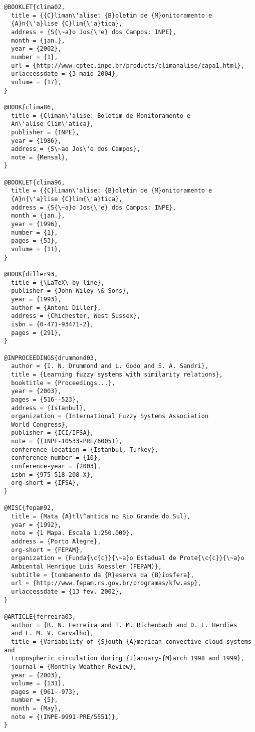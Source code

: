 \begin{verbatim}
@BOOKLET{clima02,
  title = {{C}liman\'alise: {B}oletim de {M}onitoramento e 
  {A}n{\'a}lise {C}lim{\'a}tica},
  address = {S{\~a}o Jos{\'e} dos Campos: INPE},
  month = {jan.},
  year = {2002},
  number = {1},
  url = {http://www.cptec.inpe.br/products/climanalise/capa1.html},
  urlaccessdate = {3 maio 2004},
  volume = {17},
}

@BOOK{clima86,
  title = {Climan\'alise: Boletim de Monitoramento e 
  An\'alise Clim\'atica},
  publisher = {INPE},
  year = {1986},
  address = {S\~ao Jos\'e dos Campos},
  note = {Mensal},
}

@BOOKLET{clima96,
  title = {{C}liman\'alise: {B}oletim de {M}onitoramento e 
  {A}n{\'a}lise {C}lim{\'a}tica},
  address = {S{\~a}o Jos{\'e} dos Campos: INPE},
  month = {jan.},
  year = {1996},
  number = {1},
  pages = {53},
  volume = {11},
}

@BOOK{diller93,
  title = {\LaTeX\ by line},
  publisher = {John Wiley \& Sons},
  year = {1993},
  author = {Antoni Diller},
  address = {Chichester, West Sussex},
  isbn = {0-471-93471-2},
  pages = {291},
}

@INPROCEEDINGS{drummond03,
  author = {I. N. Drummond and L. Godo and S. A. Sandri},
  title = {Learning fuzzy systems with similarity relations},
  booktitle = {Proceedings...},
  year = {2003},
  pages = {516--523},
  address = {Istanbul},
  organization = {International Fuzzy Systems Association 
  World Congress},
  publisher = {ICI/IFSA},
  note = {(INPE-10533-PRE/6005)},
  conference-location = {Istanbul, Turkey},
  conference-number = {10},
  conference-year = {2003},
  isbn = {975-518-208-X},
  org-short = {IFSA},
}

@MISC{fepam92,
  title = {Mata {A}tl\^antica no Rio Grande do Sul},
  year = {1992},
  note = {1 Mapa. Escala 1:250.000},
  address = {Porto Alegre},
  org-short = {FEPAM},
  organization = {Funda{\c{c}}{\~a}o Estadual de Prote{\c{c}}{\~a}o 
  Ambiental Henrique Luis Roessler (FEPAM)},
  subtitle = {tombamento da {R}eserva da {B}iosfera},
  url = {http://www.fepam.rs.gov.br/programas/kfw.asp},
  urlaccessdate = {13 fev. 2002},
}

@ARTICLE{ferreira03,
  author = {R. N. Ferreira and T. M. Richenbach and D. L. Herdies 
  and L. M. V. Carvalho},
  title = {Variability of {S}outh {A}merican convective cloud systems and 
  tropospheric circulation during {J}anuary-{M}arch 1998 and 1999},
  journal = {Monthly Weather Review},
  year = {2003},
  volume = {131},
  pages = {961--973},
  number = {5},
  month = {May},
  note = {(INPE-9991-PRE/5551)},
}


\end{verbatim}
